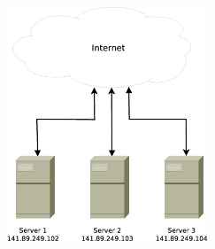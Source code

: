 \documentclass[a4paper, 12pt, BCOR10mm, DIV12, toc=bibliography, toc=listof, german]{scrbook}
\begin{document}
		\begin{figure}
			\centering
			\includegraphics[width=6cm]{images/internet-server}
			\caption{}
			\label{fig:}
		\end{figure}
\end{document}
